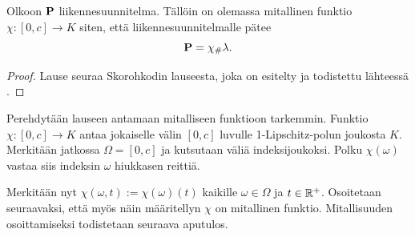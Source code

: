 \documentclass[12pt,oneside,a4paper]{amsbook} %
\begin{document}
\begin{theorem}\label{thm:skorohkod}
    Olkoon $\P$ liikennesuunnitelma. Tällöin on olemassa mitallinen funktio $\chi: [0, c] \to K$ siten, että liikennesuunnitelmalle pätee $$\P =\chi_\# \lambda.$$
\end{theorem}
\begin{proof}
    Lause seuraa Skorohkodin lauseesta, joka on esitelty ja todistettu lähteessä \cite[s. 185]{optimal}.
\end{proof}

Perehdytään lauseen antamaan mitalliseen funktioon tarkemmin. Funktio $ \chi:[0, c] \to K$ antaa jokaiselle välin $[0, c]$ luvulle 1-Lipschitz-polun joukosta $K$. Merkitään jatkossa $\Omega = [0,c]$ ja kutsutaan väliä indeksijoukoksi. Polku $ \chi(\omega)$ vastaa siis indeksin $\omega$ hiukkasen reittiä.

Merkitään nyt $\chi(\omega, t) :=  \chi(\omega)(t)$ kaikille $\omega \in \Omega$ ja $t \in \R^+$. Osoitetaan seuraavaksi, että myös näin määritellyn $\chi$ on mitallinen funktio. Mitallisuuden osoittamiseksi todistetaan seuraava aputulos.
\end{document}
